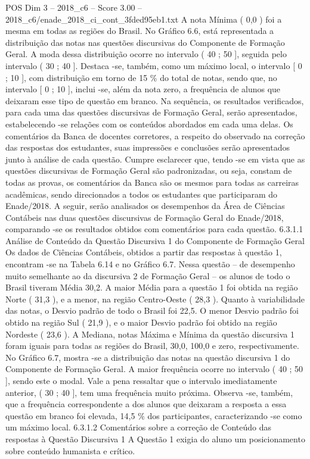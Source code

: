 \begin{textsample}{POS Dim 3 – 2018\_c6 – Score 3.00 – 2018\_c6/enade\_2018\_ci\_cont\_3fded95eb1.txt}
A nota Mínima ( 0,0 ) foi a mesma em todas as regiões do Brasil.
No Gráfico 6.6, está representada a distribuição das notas nas questões discursivas do Componente de Formação Geral.
A moda dessa distribuição ocorre no intervalo ( 40 ; 50 ], seguida pelo intervalo ( 30 ; 40 ].
Destaca -se, também, como um máximo local, o intervalo [ 0 ; 10 ], com distribuição em torno de 15 \% do total de notas, sendo que, no intervalo [ 0 ; 10 ], inclui -se, além da nota zero, a frequência de alunos que deixaram esse tipo de questão em branco.
Na sequência, os resultados verificados, para cada uma das questões discursivas de Formação Geral, serão apresentados, estabelecendo -se relações com os conteúdos abordados em cada uma delas.
Os comentários da Banca de docentes corretores, a respeito do observado na correção das respostas dos estudantes, suas impressões e conclusões serão apresentados junto à análise de cada questão.
Cumpre esclarecer que, tendo -se em vista que as questões discursivas de Formação Geral são padronizadas, ou seja, constam de todas as provas, os comentários da Banca são os mesmos para todas as carreiras acadêmicas, sendo direcionados a todos os estudantes que participaram do Enade/2018.
A seguir, serão analisados os desempenhos da Área de Ciências Contábeis nas duas questões discursivas de Formação Geral do Enade/2018, comparando -se os resultados obtidos com comentários para cada questão. 6.3.1.1 Análise de Conteúdo da Questão Discursiva 1 do Componente de Formação Geral Os dados de Ciências Contábeis, obtidos a partir das respostas à questão 1, encontram -se na Tabela 6.14 e no Gráfico 6.7.
Nessa questão – de desempenho muito semelhante ao da discursiva 2 de Formação Geral – os alunos de todo o Brasil tiveram Média 30,2.
A maior Média para a questão 1 foi obtida na região Norte ( 31,3 ), e a menor, na região Centro-Oeste ( 28,3 ).
Quanto à variabilidade das notas, o Desvio padrão de todo o Brasil foi 22,5.
O menor Desvio padrão foi obtido na região Sul ( 21,9 ), e o maior Desvio padrão foi obtido na região Nordeste ( 23,6 ).
A Mediana, notas Máxima e Mínima da questão discursiva 1 foram iguais para todas as regiões do Brasil, 30,0, 100,0 e zero, respectivamente.
No Gráfico 6.7, mostra -se a distribuição das notas na questão discursiva 1 do Componente de Formação Geral.
A maior frequência ocorre no intervalo ( 40 ; 50 ], sendo este o modal.
Vale a pena ressaltar que o intervalo imediatamente anterior, ( 30 ; 40 ], tem uma frequência muito próxima.
Observa -se, também, que a frequência correspondente a dos alunos que deixaram a resposta a essa questão em branco foi elevada, 14,5 \% dos participantes, caracterizando -se como um máximo local. 6.3.1.2 Comentários sobre a correção de Conteúdo das respostas à Questão Discursiva 1 A Questão 1 exigia do aluno um posicionamento sobre conteúdo humanista e crítico.

\end{textsample}
